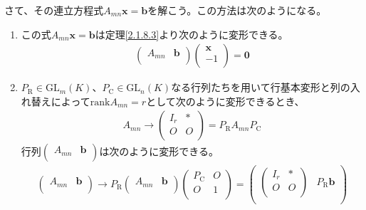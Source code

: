 \documentclass[dvipdfmx]{jsarticle}
\begin{document}
\begin{thm}\label{2.1.8.6}
さて、その連立方程式$A_{mn}\mathbf{x} = \mathbf{b}$を解こう。この方法は次のようになる。
\begin{enumerate}
\item
  この式$A_{mn}\mathbf{x} = \mathbf{b}$は定理\ref{2.1.8.3}より次のように変形できる。
\begin{align*}
\begin{pmatrix}
A_{mn} & \mathbf{b} \\
\end{pmatrix}\begin{pmatrix}
\mathbf{x} \\
 - 1 \\
\end{pmatrix} = \mathbf{0}
\end{align*}
\item
  $P_{\mathrm{R}} \in {\mathrm{GL}}_{m}(K)$、$P_{\mathrm{C}} \in {\mathrm{GL}}_{n}(K)$なる行列たちを用いて行基本変形と列の入れ替えによって${\mathrm{rank}}A_{mn} = r$として次のように変形できるとき、
\begin{align*}
A_{mn} \rightarrow \begin{pmatrix}
I_{r} & * \\
O & O \\
\end{pmatrix} = P_{\mathrm{R}}A_{mn}P_{\mathrm{C}}
\end{align*}
行列$\begin{pmatrix}
A_{mn} & \mathbf{b} \\
\end{pmatrix}$は次のように変形できる。
\begin{align*}
\begin{pmatrix}
A_{mn} & \mathbf{b} \\
\end{pmatrix} \rightarrow P_{\mathrm{R}}\begin{pmatrix}
A_{mn} & \mathbf{b} \\
\end{pmatrix}\begin{pmatrix}
P_{\mathrm{C}} & O \\
O & 1 \\
\end{pmatrix} = \begin{pmatrix}
\begin{pmatrix}
I_{r} & * \\
O & O \\
\end{pmatrix} & P_{\mathrm{R}}\mathbf{b} \\

\end{pmatrix}
\end{align*}
\end{enumerate}
\end{thm}
\end{document}
